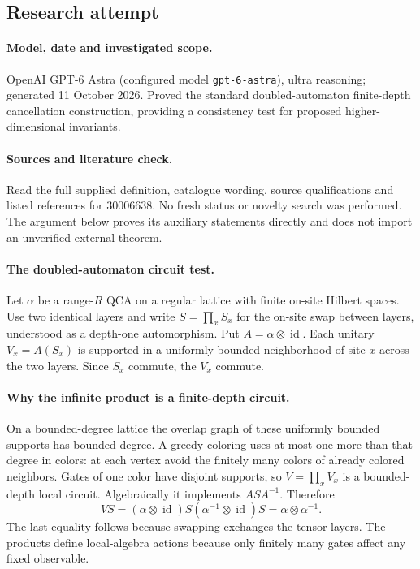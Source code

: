 \documentclass[11pt]{article}
\begin{document}
\subsection{Research attempt}
\paragraph{Model, date and investigated scope.}
OpenAI GPT-6 Astra (configured model \texttt{gpt-6-astra}), ultra reasoning; generated 11 October 2026. Proved the standard doubled-automaton finite-depth cancellation construction, providing a consistency test for proposed higher-dimensional invariants.

\paragraph{Sources and literature check.}
Read the full supplied definition, catalogue wording, source qualifications and listed references for 30006638. No fresh status or novelty search was performed. The argument below proves its auxiliary statements directly and does not import an unverified external theorem.

\paragraph{The doubled-automaton circuit test.} Let \(\alpha\) be a range-\(R\) QCA on a regular lattice with finite on-site Hilbert spaces. Use two identical layers and write \(S=\prod_xS_x\) for the on-site swap between layers, understood as a depth-one automorphism. Put \(A=\alpha\otimes\operatorname{id}\). Each unitary \(V_x=A(S_x)\) is supported in a uniformly bounded neighborhood of site \(x\) across the two layers. Since \(S_x\) commute, the \(V_x\) commute.
\paragraph{Why the infinite product is a finite-depth circuit.} On a bounded-degree lattice the overlap graph of these uniformly bounded supports has bounded degree. A greedy coloring uses at most one more than that degree in colors: at each vertex avoid the finitely many colors of already colored neighbors. Gates of one color have disjoint supports, so \(V=\prod_xV_x\) is a bounded-depth local circuit. Algebraically it implements \(ASA^{-1}\). Therefore
\[
 VS=(\alpha\otimes\operatorname{id})S
 (\alpha^{-1}\otimes\operatorname{id})S
 =\alpha\otimes\alpha^{-1}.
\]
The last equality follows because swapping exchanges the tensor layers. The products define local-algebra actions because only finitely many gates affect any fixed observable.
\end{document}
